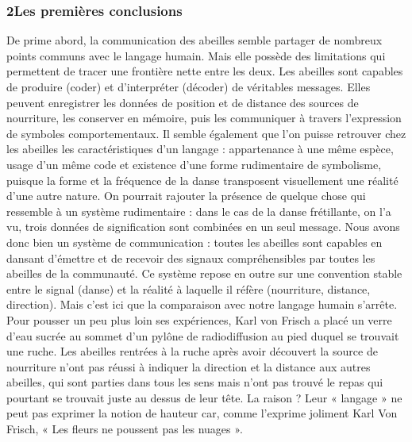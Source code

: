 \subsubsection*{2\quad Les premières conclusions}
De prime abord, la communication des abeilles semble partager de nombreux points communs avec le langage humain. Mais elle possède des limitations qui permettent de tracer une frontière nette entre les deux.
Les abeilles sont capables de produire (coder) et d’interpréter (décoder) de véritables messages. Elles peuvent enregistrer les données de position et de distance des sources de nourriture, les conserver en mémoire, puis les communiquer à travers l’expression de symboles comportementaux. Il semble également que l’on puisse retrouver chez les abeilles les caractéristiques d’un langage : appartenance à une même espèce, usage d’un même code et existence d’une forme rudimentaire de symbolisme, puisque la forme et la fréquence de la danse transposent visuellement une réalité d’une autre nature. On pourrait rajouter la présence de quelque chose qui ressemble à un système rudimentaire : dans le cas de la danse frétillante, on l’a vu, trois données de signification sont combinées en un seul message. Nous avons donc bien un système de communication : toutes les abeilles sont capables en dansant d’émettre et de recevoir des signaux compréhensibles par toutes les abeilles de la communauté. Ce système repose en outre sur une convention stable entre le signal (danse) et la réalité à laquelle il réfère (nourriture, distance, direction). Mais c’est ici que la comparaison avec notre langage humain s’arrête.
Pour pousser un peu plus loin ses expériences, Karl von Frisch a placé un verre d’eau sucrée au sommet d’un pylône de radiodiffusion au pied duquel se trouvait une ruche. Les abeilles rentrées à la ruche après avoir découvert la source de nourriture n’ont pas réussi à indiquer la direction et la distance aux autres abeilles, qui sont parties dans tous les sens mais n’ont pas trouvé le repas qui pourtant se trouvait juste au dessus de leur tête. La raison ? Leur « langage » ne peut pas exprimer la notion de hauteur car, comme l’exprime joliment Karl Von Frisch, « Les fleurs ne poussent pas les nuages ».
